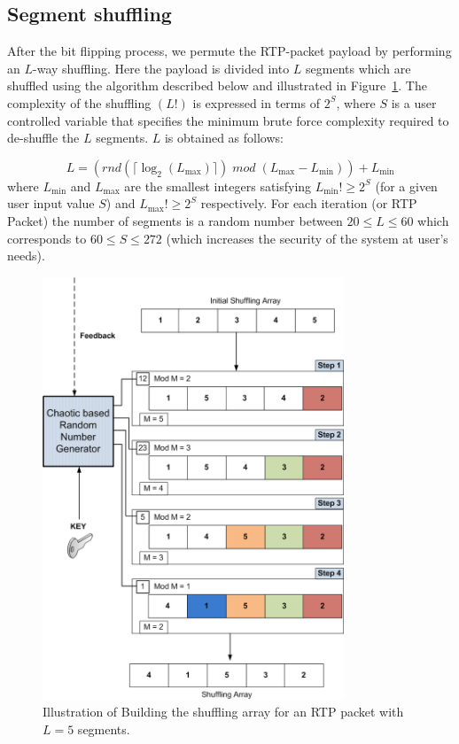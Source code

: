 \documentclass[preprint]{elsarticle}
\begin{document}
\subsection{Segment shuffling}

After the bit flipping process, we permute the RTP-packet payload by performing an $L$-way shuffling. Here the payload is divided into $L$ segments which are shuffled using the algorithm described below and illustrated in Figure~\ref{f4}. The complexity of the shuffling $(L!)$ is expressed in terms of $2^{S}$, where $S$ is a user controlled variable that specifies the minimum brute force complexity required to de-shuffle the $L$ segments. $L$ is obtained as follows:

\begin{equation}
L = (rnd (\lceil \log_{2}(L_{\max}) \rceil ) \;mod  \; (L_{\max} -L_{\min})) + L_{\min}
\label{ec8}
\end{equation}
where $L_{\min}$ and $L_{\max}$ are the smallest integers satisfying  $L_{\min}! \geq 2^{S}$ (for a given user input value $S$) and $L_{\max}! \geq 2^{S}$ respectively. For each iteration (or RTP Packet) the number of segments is a random number between $20 \leq L \leq 60$ which corresponds to $60 \leq S \leq 272$ (which increases the security of the system at user's needs).

\begin{figure}[!ht]
\centering
\includegraphics[width=9cm]{figure4.png}
\caption{Illustration of Building the shuffling array for an RTP packet with $L=5$ segments.}
\label{f4}
\end{figure} 
\end{document}
